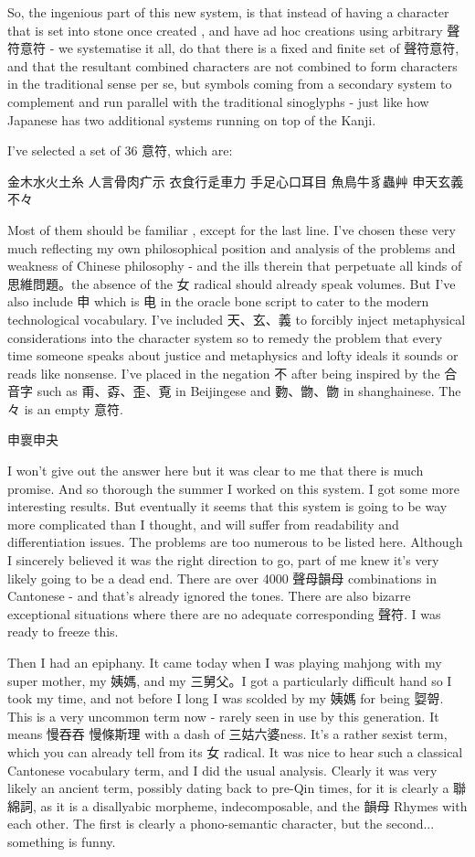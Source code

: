 So, the ingenious part of this new system, is that instead of having a character that is set into stone once created , and have ad hoc creations using arbitrary 聲符意符 - we systematise it all, do that there is a fixed and finite set of 聲符意符, and that the resultant combined characters are not combined to form characters in the traditional sense per se, but symbols coming from a secondary system to complement and run parallel with the traditional sinoglyphs - just like how Japanese has two additional systems running on top of the Kanji.

I've selected a set of 36 意符, which are:

金木水火土糸
人言骨肉疒示
衣食行辵車力
手足心口耳目
魚鳥牛豸蟲艸
申天玄義不々

Most of them should be familiar , except for the last line. I've chosen these very much reflecting my own philosophical position and analysis of the problems and weakness of Chinese philosophy - and the ills therein that perpetuate all kinds of 思維問題。the absence of the 女 radical should already speak volumes. But I've also include 申 which is 电 in the oracle bone script to cater to the modern technological vocabulary. I've included 天、玄、義 to forcibly inject metaphysical considerations into the character system so to remedy the problem that every time someone speaks about justice and metaphysics and lofty ideals it sounds or reads like nonsense. I've placed in the negation 不 after being inspired by the 合音字 such as 甭、孬、歪、覔 in Beijingese and 覅、朆、朆 in shanghainese. The 々 is an empty 意符.

申褱申夬


I won't give out the  answer here but it was clear to me that there is much promise. And so thorough the summer I worked on this system. I got some more interesting results. But eventually it seems that this system is going to be way more complicated than I thought, and will suffer from readability and differentiation issues. The problems are too numerous to be listed here. Although I sincerely believed it was the right direction to go, part of me knew it's very likely going to be a dead end. There are over 4000 聲母韻母 combinations in Cantonese - and that's already ignored the tones. There are also bizarre exceptional situations where there are no adequate corresponding 聲符. I was ready to freeze this.

Then I had an epiphany. It came today when I was playing mahjong with my super mother, my 姨媽, and my 三舅父。I got a particularly difficult hand so I took my time, and not before I long I was scolded by my 姨媽 for being 娿哿. This is a very uncommon term now - rarely seen in use by this generation. It means 慢吞吞 慢條斯理 with a dash of 三姑六婆ness. It's a rather sexist term, which you can already tell from its 女 radical. It was nice to hear such a classical Cantonese vocabulary term, and I did the usual analysis. Clearly it was very likely an ancient term, possibly dating back to pre-Qin times, for it is clearly a 聯綿詞, as it is a disallyabic morpheme, indecomposable, and the 韻母 Rhymes with each other. The first is clearly a phono-semantic character, but the second... something is funny.

